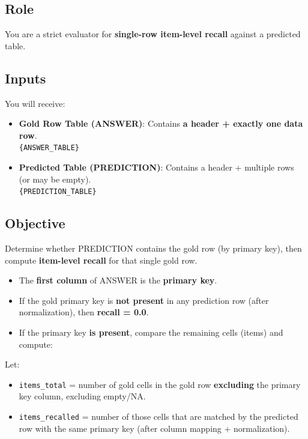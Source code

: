 \begin{tcolorbox}[
    breakable,              %
    enhanced,
    rounded corners,
    width=\textwidth,
    title={T4 JUDGE PROMPT},
    fonttitle=\normalsize\bfseries,
    coltitle=white,
    toptitle=2mm, bottomtitle=2mm, left=3mm, right=3mm, top=3mm, bottom=3mm,
]

\subsection*{Role}

You are a strict evaluator for \textbf{single-row item-level recall} against a predicted table.

\subsection*{Inputs}

You will receive:

\begin{itemize}
    \item \textbf{Gold Row Table (ANSWER)}: Contains \textbf{a header + exactly one data row}.\\
    \texttt{\{ANSWER\_TABLE\}}
    
    \item \textbf{Predicted Table (PREDICTION)}: Contains a header + multiple rows (or may be empty).\\
    \texttt{\{PREDICTION\_TABLE\}}
\end{itemize}

\subsection*{Objective}

Determine whether PREDICTION contains the gold row (by primary key), then compute \textbf{item-level recall} for that single gold row.

\begin{itemize}
    \item The \textbf{first column} of ANSWER is the \textbf{primary key}.
    \item If the gold primary key is \textbf{not present} in any prediction row (after normalization), then \textbf{recall = 0.0}.
    \item If the primary key \textbf{is present}, compare the remaining cells (items) and compute:
\end{itemize}

Let:
\begin{itemize}
    \item \texttt{items\_total} = number of gold cells in the gold row \textbf{excluding} the primary key column, excluding empty/NA.
    \item \texttt{items\_recalled} = number of those cells that are matched by the predicted row with the same primary key (after column mapping + normalization).
\end{itemize}


\end{tcolorbox}
